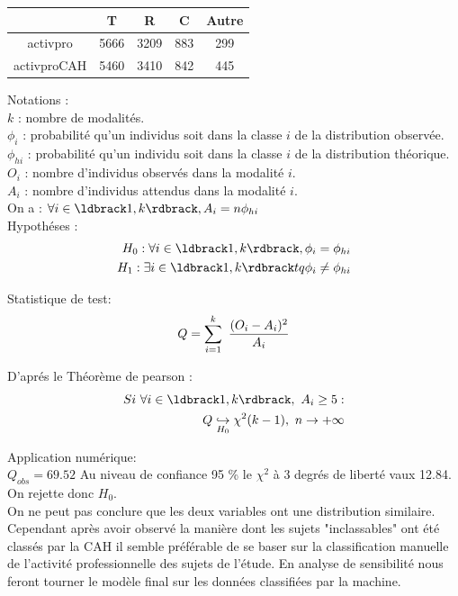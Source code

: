 \documentclass{book}
\begin{document}
\begin{center}
\setlength\arrayrulewidth{.1pt}
\begin{tabular}{|c||c|c|c|c|}
\hline
	& T & R & C & Autre\\
\hline
\hline
activpro & 5666 & 3209 & 883 & 299\\
\hline
activproCAH & 5460 & 3410 & 842 & 445\\
\hline
\end{tabular}
\end{center}
\noindent
Notations : \\
$k$ : nombre de modalités.\\
$\phi_i$ : probabilité qu'un individus soit dans la classe $i$ de la distribution observée.\\ 
$\phi_{hi}$ : probabilité qu'un individu soit dans la classe $i$ de la distribution théorique.\\
$O_i$ : nombre d'individus observés dans la modalité $i$.\\
$A_i$ : nombre d'individus attendus dans la modalité $i$.\\
On a : $\forall i \in \ldbrack 1,k \rdbrack , A_i = n \phi_{hi}$\\

\noindent
Hypothéses :
\begin{equation}
\begin{split}
H_0 : \forall i \in \ldbrack 1,k \rdbrack ,\phi_i = \phi_{hi}\\
H_1 : \exists i \in \ldbrack 1,k \rdbrack tq \phi_i \neq \phi_{hi}
\end{split}
\end{equation}

\noindent
Statistique de test:
\begin{equation}
Q = \sum_{i=1}^k ~{{(O_i - A _i)^2} \over {A_i}}
\end{equation}

\noindent
D'aprés le Théorème de pearson : 
\begin{equation}
\begin{split}
Si ~\forall i  \in \ldbrack 1,k \rdbrack, ~ A_i \geq 5 :\\
Q \underset {\small{H_0}}{\hookrightarrow} \chi ^{2} (k-1) , ~ n \rightarrow +\infty
\end{split}
\end{equation}

\noindent
Application numérique: \\
 $Q_{obs} = 69.52$ 
Au niveau de confiance 95 \% le $\chi ^2$ à 3 degrés de liberté vaux 12.84.\\
On rejette donc $H_0$.
\\
\noindent
On ne peut pas conclure que les deux variables ont une distribution similaire. Cependant après avoir observé la manière dont les sujets "inclassables" ont été classés par la CAH il semble préférable de se baser sur la classification manuelle de l'activité professionnelle des sujets de l'étude. En analyse de sensibilité nous feront tourner le modèle final sur les données classifiées par la machine.\\
\end{document}
